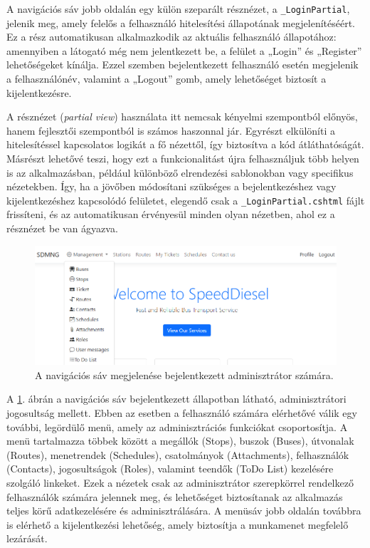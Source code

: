 A navigációs sáv jobb oldalán egy külön szeparált résznézet, a \texttt{\_LoginPartial}, jelenik meg, amely felelős a felhasználó hitelesítési állapotának megjelenítéséért. Ez a rész automatikusan alkalmazkodik az aktuális felhasználó állapotához: amennyiben a látogató még nem jelentkezett be, a felület a „Login” és „Register” lehetőségeket kínálja. Ezzel szemben bejelentkezett felhasználó esetén megjelenik a felhasználónév, valamint a „Logout” gomb, amely lehetőséget biztosít a kijelentkezésre.

A résznézet (\emph{partial view}) használata itt nemcsak kényelmi szempontból előnyös, hanem fejlesztői szempontból is számos haszonnal jár. Egyrészt elkülöníti a hitelesítéssel kapcsolatos logikát a fő nézettől, így biztosítva a kód átláthatóságát. Másrészt lehetővé teszi, hogy ezt a funkcionalitást újra felhasználjuk több helyen is az alkalmazásban, például különböző elrendezési sablonokban vagy specifikus nézetekben. Így, ha a jövőben módosítani szükséges a bejelentkezéshez vagy kijelentkezéshez kapcsolódó felületet, elegendő csak a \texttt{\_LoginPartial.cshtml} fájlt frissíteni, és az automatikusan érvényesül minden olyan nézetben, ahol ez a résznézet be van ágyazva.

\begin{figure}[H]
\centering
\includegraphics[width=1\textwidth]{Szakdolgozat/Mellekletek/navsavlogin1.PNG}
\caption{A navigációs sáv megjelenése bejelentkezett adminisztrátor számára.}
\label{fig:navsavlogged}
\end{figure}

A \ref{fig:navsavlogged}. ábrán a navigációs sáv bejelentkezett állapotban látható, adminisztrátori jogosultság mellett. Ebben az esetben a felhasználó számára elérhetővé válik egy további, legördülő menü, amely az adminisztrációs funkciókat csoportosítja. A menü tartalmazza többek között a megállók (Stops), buszok (Buses), útvonalak (Routes), menetrendek (Schedules), csatolmányok (Attachments), felhasználók (Contacts), jogosultságok (Roles), valamint teendők (ToDo List) kezelésére szolgáló linkeket. Ezek a nézetek csak az adminisztrátor szerepkörrel rendelkező felhasználók számára jelennek meg, és lehetőséget biztosítanak az alkalmazás teljes körű adatkezelésére és adminisztrálására. A menüsáv jobb oldalán továbbra is elérhető a kijelentkezési lehetőség, amely biztosítja a munkamenet megfelelő lezárását.

